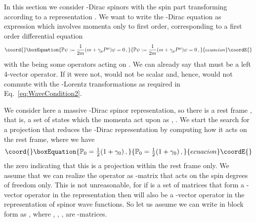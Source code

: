 \documentclass[12pt,a4paper]{article}
\providecommand{\Proj}{\mathbb{P}}
\begin{document}
In this section we consider \coordHE{}-Dirac spinors \coordHE{} with the spin part transforming according to a
\coordHE{} representation
\cite{Blohmann}. We want to write the \coordHE{}-Dirac equation as expression
which involves momenta only to first order, corresponding to a first
order differential equation 
\begin{equation}\coord{}\boxEquation{
  \Proj \psi := \frac{1}{2m}(m + \gamma_\mu P^\mu)\psi = 0 \,,
}{
  \Proj \psi := \frac{1}{2m}(m + \gamma_\mu P^\mu)\psi = 0 \,,
}{ecuacion}\coordE{}\end{equation}
with the \myHighlight{$\gamma_\mu$}\coordHE{} being some operators acting on \coordHE{}. We can
already say that \myHighlight{$\gamma_\mu$}\coordHE{} must be a left 4-vector operator.  If it
were not, \coordHE{} would not be scalar and, hence, would not
commute with the \coordHE{}-Lorentz transformations as required in
Eq.~\eqref{eq:WaveCondition2}.

We consider here a massive \coordHE{}-Dirac spinor representation, so there
is a rest frame \cite{Blohmann:2001a}, that is, a set of states
\coordHE{} which the momenta act upon as \coordHE{},
\coordHE{}. We start the search for a projection \myHighlight{$\Proj$}\coordHE{} that
reduces the \coordHE{}-Dirac representation by computing how it acts on the
rest frame, where we have
\begin{equation}\coord{}\boxEquation{
  \Proj_0 = \tfrac{1}{2}(1 + \gamma_0) \,,
}{
  \Proj_0 = \tfrac{1}{2}(1 + \gamma_0) \,,
}{ecuacion}\coordE{}\end{equation}
the zero indicating that this is a projection within the rest frame
only. We assume that we can realize the operator \coordHE{} as
\coordHE{}-matrix that acts on the spin degrees of freedom only. This
is not unreasonable, for if \myHighlight{$\gamma_\mu$}\coordHE{} is a set of matrices that
form a \coordHE{}-vector operator in the \coordHE{} representation then \coordHE{} will
also be a \coordHE{}-vector operator in the representation of spinor wave
functions. So let us assume we can write \myHighlight{$\Proj_0 = \Proj_0
\otimes 1$}\coordHE{} in block form as \myHighlight{$\Proj_0 = (\begin{smallmatrix} A & B \\
  C & D \end{smallmatrix})$}\coordHE{}, where \coordHE{}, \coordHE{}, \coordHE{}, \coordHE{} are \coordHE{}-matrices.
\end{document}
